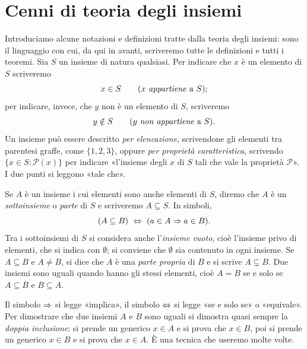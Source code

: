 \section{Cenni di teoria degli insiemi}
\label{sec:insiemi}

Introduciamo alcune notazioni e definizioni tratte dalla teoria degli insiemi: sono il
linguaggio con cui, da qui in avanti, scriveremo tutte le definizioni e tutti i
teoremi. Sia $S$ un insieme di natura qualsiasi. Per indicare che $x$ è un elemento di
$S$ scriveremo
\[
  x\in S \qquad (x \text{ \emph{appartiene} a } S);
\]
per indicare, invece, che $y$ non è un elemento di $S$, scriveremo
\[
  y\notin S \qquad (y \text{ \emph{non appartiene} a } S).
\]
Un insieme può essere descritto \emph{per elencazione}, scrivendone gli elementi tra
parentesi graffe, come $\{1,2,3\}$, oppure \emph{per proprietà caratteristica}, scrivendo
$\{x\in S : \mathcal{P}(x)\}$ per indicare «l'insieme degli $x$ di $S$ tali che vale la
proprietà $\mathcal{P}$». I due punti si leggono «tale che».

\begin{definizione}
Se $A$ è un insieme i cui elementi sono anche elementi di $S$, diremo che $A$ è un
\emph{sottoinsieme} o \emph{parte} di $S$ e scriveremo $A\subseteq S$.
In simboli,
\[
  (A\subseteq B) \ \Leftrightarrow\ (a\in A \Rightarrow a\in B).
\]
Tra i sottoinsiemi di $S$ si considera anche l'\emph{insieme vuoto},
cioè l'insieme privo di elementi, che si indica con $\emptyset$; si conviene che
$\emptyset$ sia contenuto in ogni insieme. Se $A\subseteq B$ e $A\neq B$, si dice che
$A$ è una \emph{parte propria} di $B$ e si scrive $A\subsetneq B$. Due insiemi sono
uguali quando hanno gli stessi elementi, cioè $A=B$ se e solo se $A\subseteq B$ e
$B\subseteq A$.
\end{definizione}

\begin{osservazione}
Il simbolo $\Rightarrow$ si legge «implica», il simbolo $\Leftrightarrow$ si legge «se e solo se» o
«equivale». Per dimostrare che due insiemi $A$ e $B$ sono uguali si dimostra quasi
sempre la \emph{doppia inclusione}: si prende un generico $x\in A$ e si prova che
$x\in B$, poi si prende un generico $x\in B$ e si prova che $x\in A$. È una tecnica
che useremo molte volte.
\end{osservazione}

